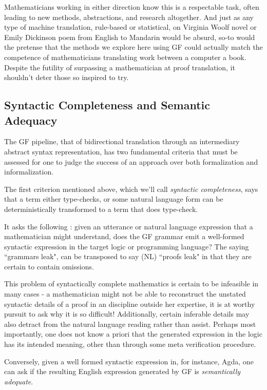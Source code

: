 Mathematicians working in either direction know this is a respectable task,
often leading to new methods, abstractions, and research altogether. And just as
any type of machine translation, rule-based or statistical, on Virginia Woolf
novel or Emily Dickinson poem from English to Mandarin would be 
absurd, so-to would the pretense that the methods we explore here using GF
could actually match the competence of mathematicians translating work between a
computer a book. Despite the futility of surpassing a mathematician at proof
translation, it shouldn't deter those so inspired to try.

\subsection{Syntactic Completeness and Semantic Adequacy}

The GF pipeline, that of bidirectional translation through an intermediary
abstract syntax representation, has two fundamental criteria that must be
assessed for one to judge the success of an approach over both formalization and
informalization.

The first criterion mentioned above, which we'll call \emph{syntactic
  completeness}, says that a term either type-checks, or some natural language
form can be deterministically transformed to a term that does type-check.

It asks the following : given an utterance or natural language expression that a
mathematician might understand, does the GF grammar emit a well-formed syntactic
expression in the target logic or programming language? The saying ``grammars
leak", can be transposed to say (NL) ``proofs leak" in that they are certain to
contain omissions.

This problem of syntactically complete mathematics is certain to be infeasible
in many cases - a mathematician might not be able to reconstruct the unstated
syntactic details of a proof in an discipline outside her expertise, it is at
worthy pursuit to ask why it is so difficult! Additionally, certain inferable
details may also detract from the natural language reading rather than assist.
Perhaps most importantly, one does not know a priori that the generated
expression in the logic has its intended meaning, other than through some meta
verification procedure.

Conversely, given a well formed syntactic expression in, for instance, Agda, one
can ask if the resulting English expression generated by GF is
\emph{semantically adequate}.


